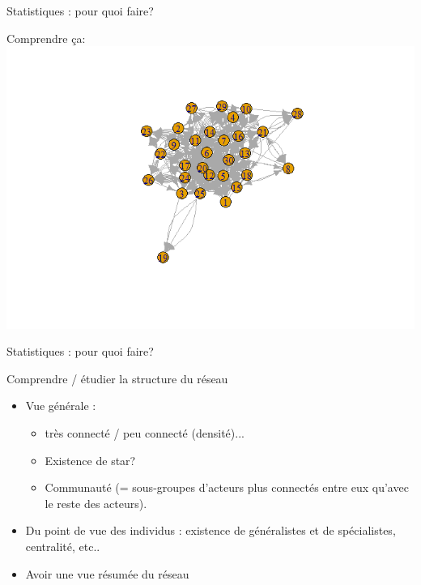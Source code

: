 \documentclass[compress,10pt]{beamer}
\begin{document}
\begin{frame}{Statistiques : pour quoi faire? }

Comprendre ça: 
\centering
 \includegraphics[width =  \textwidth]{plots/Vanuatu_directed.png}  

\end{frame}


\begin{frame}{Statistiques : pour quoi faire? }


\begin{block}{Comprendre / étudier la structure du réseau}
\begin{itemize}
\item Vue générale :  
\begin{itemize}
\item très connecté  / peu connecté (densité)...  
\item Existence de star?  
\item Communauté (= sous-groupes d'acteurs plus connectés entre eux qu'avec le reste des acteurs).   
\end{itemize}
\item Du point de vue des individus : existence de  généralistes et de spécialistes,  centralité, etc.. 
\item Avoir une vue résumée du réseau
\end{itemize}
\end{block}
\end{frame}
\end{document}
